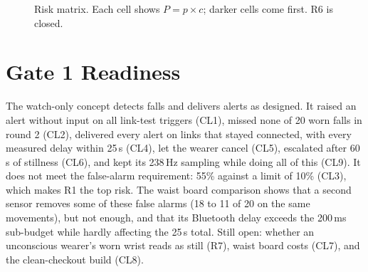 \documentclass[conference]{IEEEtran}
\begin{document}
\begin{figure}[!t]
\centering
{}
\caption{Risk matrix. Each cell shows $P = p \times c$; darker cells come first. R6 is closed.}
\label{fig:matrix}
\end{figure}



\section{Gate 1 Readiness}
\label{sec:readiness}

The watch-only concept detects falls and delivers alerts as designed. It raised an alert without input on all link-test triggers (CL1), missed none of 20 worn falls in round 2 (CL2), delivered every alert on links that stayed connected, with every measured delay within 25\,s (CL4), let the wearer cancel (CL5), escalated after 60\,s of stillness (CL6), and kept its 238\,Hz sampling while doing all of this (CL9). It does not meet the false-alarm requirement: 55\% against a limit of 10\% (CL3), which makes R1 the top risk. The waist board comparison shows that a second sensor removes some of these false alarms (18 to 11 of 20 on the same movements), but not enough, and that its Bluetooth delay exceeds the 200\,ms sub-budget while hardly affecting the 25\,s total. Still open: whether an unconscious wearer's worn wrist reads as still (R7), waist board costs (CL7), and the clean-checkout build (CL8).
\end{document}
